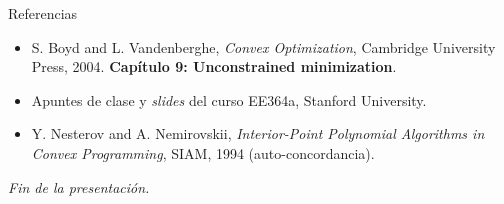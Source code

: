 \documentclass[10pt,aspectratio=169]{beamer}
\begin{document}
\begin{frame}{Referencias}
  \begin{itemize}
    \item S. Boyd and L. Vandenberghe, \emph{Convex Optimization}, Cambridge University Press, 2004.
          \textbf{Capítulo 9: Unconstrained minimization}.
    \item Apuntes de clase y \emph{slides} del curso EE364a, Stanford University.
    \item Y. Nesterov and A. Nemirovskii, \emph{Interior-Point Polynomial Algorithms in Convex Programming},
          SIAM, 1994 (auto-concordancia).
  \end{itemize}
  \vspace{1em}
  \begin{center}
    \emph{Fin de la presentación.}
  \end{center}
\end{frame}
\end{document}
